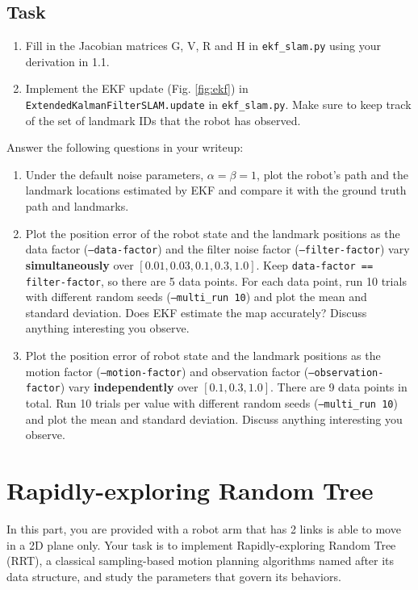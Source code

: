 \documentclass[tp]{lcc}
\begin{document}
\subsection*{Task}
\begin{enumerate}
    \item Fill in the Jacobian matrices G, V, R and H in \texttt{ekf\_slam.py} using your derivation in 1.1.
    \item Implement the EKF update (Fig. \ref{fig:ekf}) in \texttt{ExtendedKalmanFilterSLAM.update} in \texttt{ekf\_slam.py}. Make sure to keep track of the set of landmark IDs that the robot has observed.
\end{enumerate}

Answer the following questions in your writeup:
\begin{enumerate}[label=(\alph*)]
    \item Under the default noise parameters, $\alpha=\beta=1$, plot the robot's path and the landmark locations estimated by EKF and compare it with the ground truth path and landmarks.
    \item Plot the position error of the robot state and the landmark positions as the data factor (\texttt{--data-factor}) and the filter noise factor (\texttt{--filter-factor}) vary \textbf{simultaneously} over $[0.01,0.03,0.1,0.3,1.0]$. Keep \texttt{data-factor == filter-factor}, so there are 5 data points. For each data point, run 10 trials with different random seeds (\texttt{--multi\_run 10}) and plot the mean and standard deviation. Does EKF estimate the map accurately? Discuss anything interesting you observe.
    \item Plot the position error of robot state and the landmark positions as the motion factor (\texttt{--motion-factor}) and observation factor (\texttt{--observation-factor}) vary \textbf{independently} over $[0.1,0.3,1.0]$. There are 9 data points in total. Run 10 trials per value with different random seeds (\texttt{--multi\_run 10}) and plot the mean and standard deviation. Discuss anything interesting you observe.
\end{enumerate}

\section{Rapidly-exploring Random Tree}
In this part, you are provided with a robot arm that has 2 links is able to move in a 2D plane only. Your task is to implement Rapidly-exploring Random Tree (RRT), a classical sampling-based motion planning algorithms named after its data structure, and study the parameters that govern its behaviors.
\end{document}
